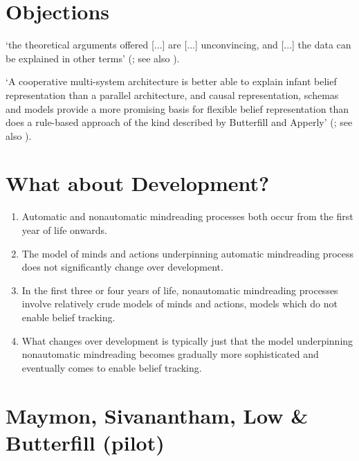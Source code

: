 \documentclass[12pt]{extarticle}
\begin{document}
\begin{multicols*}{3}
\section{Objections}
‘the theoretical arguments offered [...] are [...] unconvincing, and [...]
the data can be explained in other terms’
(\citealp{carruthers:2015_two}; see also \citealp{carruthers:2015_mindreading}).

‘A cooperative multi-system architecture is better able to explain infant belief representation than a
parallel architecture, and causal representation, schemas and models provide a more promising basis
for flexible belief representation than does a rule-based approach of the kind described by Butterfill
and Apperly’ (\citealp{christensen:_twoa}; see also \citealp{michael:2016_flexible,michael:2013_mindreading}).

\section{What about Development?}
\begin{enumerate}
\item Automatic and nonautomatic mindreading processes both occur from the first year of life onwards.
\item The model of minds and actions underpinning automatic mindreading process does not
significantly change over development.
\item In the first three or four years of life, nonautomatic mindreading processes involve
relatively crude models of minds and actions, models which do not enable belief tracking.
\item What changes over development is typically just that the model underpinning nonautomatic
mindreading becomes gradually more sophisticated and eventually comes to enable belief tracking.
\end{enumerate}




\section{Maymon, Sivanantham, Low \& Butterfill (pilot)}


\end{multicols*}
\end{document}
